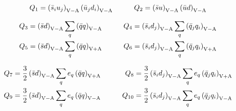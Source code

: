 
\begin{eqnarray}
Q_{1} = \left( \bar s_{i} u_{j}  \right)_{\mathrm{V-A}}
            \left( \bar u_{j}  d_{i} \right)_{\mathrm{V-A}}
&\qquad&
Q_{2} = \left( \bar s u \right)_{\mathrm{V-A}}
            \left( \bar u d \right)_{\mathrm{V-A}}
\label{eq:Q12}
\end{eqnarray}


\begin{eqnarray}
Q_{3} = \left( \bar s d \right)_{\mathrm{V-A}}
   \sum_{q} \left( \bar q q \right)_{\mathrm{V-A}}
&\qquad&
Q_{4} = \left( \bar s_{i} d_{j}  \right)_{\mathrm{V-A}}
   \sum_{q} \left( \bar q_{j}  q_{i} \right)_{\mathrm{V-A}}
\label{eq:Q34} \\
Q_{5} = \left( \bar s d \right)_{\mathrm{V-A}}
   \sum_{q} \left( \bar q q \right)_{\mathrm{V+A}}
&\qquad&
Q_{6} = \left( \bar s_{i} d_{j}  \right)_{\mathrm{V-A}}
   \sum_{q} \left( \bar q_{j}  q_{i} \right)_{\mathrm{V+A}}
\label{eq:Q56}
\end{eqnarray}


\begin{eqnarray}
Q_{7} = \frac{3}{2} \left( \bar s d \right)_{\mathrm{V-A}}
         \sum_{q} e_{q} \left( \bar q q \right)_{\mathrm{V+A}}
&\qquad&
Q_{8} = \frac{3}{2} \left( \bar s_{i} d_{j} \right)_{\mathrm{V-A}}
         \sum_{q} e_{q} \left( \bar q_{j}  q_{i}\right)_{\mathrm{V+A}}
\label{eq:Q78} \\
Q_{9} = \frac{3}{2} \left( \bar s d \right)_{\mathrm{V-A}}
         \sum_{q} e_{q} \left( \bar q q \right)_{\mathrm{V-A}}
&\qquad&
Q_{10} = \frac{3}{2} \left( \bar s_{i} d_{j} \right)_{\mathrm{V-A}}
         \sum_{q} e_{q} \left( \bar q_{j}  q_{i}\right)_{\mathrm{V-A}}
\label{eq:Q910}
\end{eqnarray}

